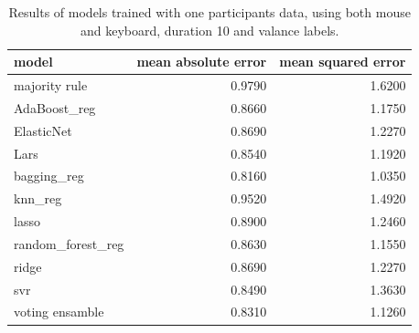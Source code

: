 \documentclass[../main.tex]{subfiles}
\begin{document}
\begin{table}[!h]
    \centering
    \begin{tabular}{lrr}
        \toprule
                     model &  mean absolute error &  mean squared error \\
        \midrule
             majority rule &               0.9790 &              1.6200 \\
              AdaBoost\_reg &               0.8660 &              1.1750 \\
                ElasticNet &               0.8690 &              1.2270 \\
                      Lars &               0.8540 &              1.1920 \\
               bagging\_reg &               0.8160 &              1.0350 \\
                   knn\_reg &               0.9520 &              1.4920 \\
                     lasso &               0.8900 &              1.2460 \\
         random\_forest\_reg &               0.8630 &              1.1550 \\
                     ridge &               0.8690 &              1.2270 \\
                       svr &               0.8490 &              1.3630 \\
           voting ensamble &               0.8310 &              1.1260 \\
        \bottomrule
    \end{tabular}
    \caption{Results of models trained with one participants data, using both mouse and keyboard, duration 10 and valance labels.}             
\end{table}
\end{document}
